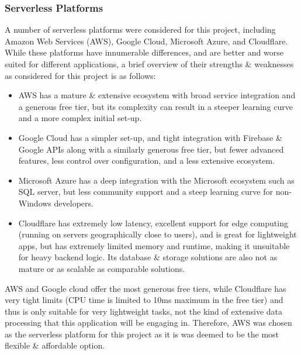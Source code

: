 \documentclass[a4paper,11pt]{report}
\begin{document}
\subsubsection{Serverless Platforms}
A number of serverless platforms were considered for this project, including Amazon Web Services (AWS)\supercite{aws}, Google Cloud\supercite{googlecloud}, Microsoft Azure\supercite{azure}, and Cloudflare\supercite{cloudflare}.
While these platforms have innumerable differences, and are better and worse suited for different applications, a brief overview of their strengths \& weaknesses as considered for this project is as follows:
\begin{itemize}
    \item   AWS has a mature \& extensive ecosystem with broad service integration and a generous free tier, but its complexity can result in a steeper learning curve and a more complex initial set-up.
    \item   Google Cloud has a simpler set-up, and tight integration with Firebase \& Google APIs along with a similarly generous free tier, but fewer advanced features, less control over configuration, and a less extensive ecosystem.
    \item   Microsoft Azure has a deep integration with the Microsoft ecosystem such as SQL server\supercite{azuresql}, but less community support and a steep learning curve for non-Windows developers.
    \item   Cloudflare has extremely low latency, excellent support for edge computing\supercite{ibm_edge_computing} (running on servers geographically close to users), and is great for lightweight apps, but has extremely limited memory and runtime, making it unsuitable for heavy backend logic.
            Its database \& storage solutions are also not as mature or as scalable as comparable solutions.
\end{itemize}

AWS and Google cloud offer the most generous free tiers, while Cloudflare has very tight limits (CPU time is limited to 10ms maximum in the free tier\supercite{cloudflareworkers}) and thus is only suitable for very lightweight tasks, not the kind of extensive data processing that this application will be engaging in.
Therefore, AWS was chosen as the serverless platform for this project as it is was deemed to be the most flexible \& affordable option.
\end{document}
